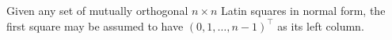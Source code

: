 Given any set of mutually orthogonal $n \times n$ Latin squares in normal form, the first square may be assumed to have $(0, 1, \dots, n-1)^\top$ as its left column.
